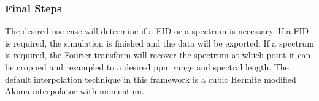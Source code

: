\subsubsection{Final Steps} The desired use case will determine if a FID or a spectrum is necessary. If a FID is required, the simulation is finished and the data will be exported. If a spectrum is required, the Fourier transform will recover the spectrum at which point it can be cropped and resampled to a desired ppm range and spectral length. The default interpolation technique in this framework is a cubic Hermite modified Akima interpolator with momentum.
